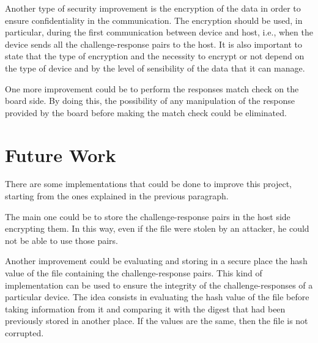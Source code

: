Another type of security improvement is the encryption of the data in order to ensure confidentiality in the communication. The encryption should be used, in particular, during the first communication between device and host, i.e., when the device sends all the challenge-response pairs to the host.
It is also important to state that the type of encryption and the necessity to encrypt or not depend on the type of device and by the level of sensibility of the data that it can manage.

One more improvement could be to perform the responses match check on the board side. By doing this, the possibility of any manipulation of the response provided by the board before making the match check could be eliminated.


\section{Future Work}
There are some implementations that could be done to improve this project, starting from the ones explained in the previous paragraph.

The main one could be to store the challenge-response pairs in the host side encrypting them. In this way, even if the file were stolen by an attacker, he could not be able to use those pairs.

Another improvement could be evaluating and storing in a secure place the hash value of the file containing the challenge-response pairs.
This kind of implementation can be used to ensure the integrity of the challenge-responses of a particular device.
The idea consists in evaluating the hash value of the file before taking information from it and comparing it with the digest that had been previously stored in another place. If the values are the same, then the file is not corrupted.




